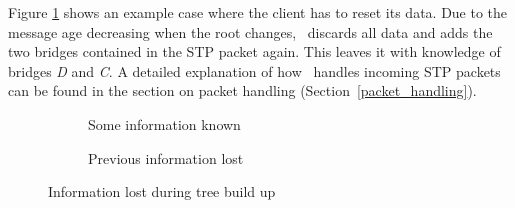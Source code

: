 Figure \ref{fig:information_lost} shows an example case where the client has to reset its data.
Due to the message age decreasing when the root changes, \tool\ discards all data and adds the two bridges contained in the STP packet again.
This leaves it with knowledge of bridges \textit{D} and \textit{C}.
A detailed explanation of how \tool\ handles incoming STP packets can be found in the section on packet handling (Section~\ref{packet_handling}).

\begin{figure}[h]
    \begin{centering}
        \begin{subfigure}[b]{0.4\textwidth}
            \caption{Some information known}
        \end{subfigure}
        \hspace{1cm}
        \begin{subfigure}[b]{0.4\textwidth}
            \caption{Previous information lost}
        \end{subfigure}
        \caption{Information lost during tree build up}
        \label{fig:information_lost}
    \end{centering}
\end{figure}

